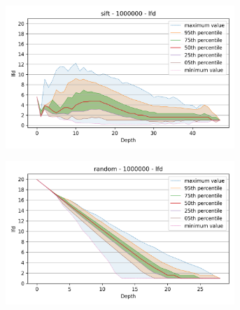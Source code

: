 \begin{figure}
\begin{subfigure}[b]{0.47\textwidth}
    \label{fig:results:glove-25-lfd}
    \end{subfigure}
    \vspace{1em}
    \\
    \begin{subfigure}[b]{0.47\textwidth}
    \includegraphics[width=0.95\textwidth]{images/lfd_plots/sift-1000000-lfd.png}\\
    \label{fig:results:sift-lfd}
    \end{subfigure}%
    \begin{subfigure}[b]{0.47\textwidth}
    \includegraphics[width=0.95\textwidth]{images/lfd_plots/random-1000000-lfd.png}\\
    \label{fig:results:random-lfd}
    \end{subfigure}
    \vspace{1em}
    \\
    \begin{subfigure}[b]{0.47\textwidth}

\end{subfigure}
\end{figure}
